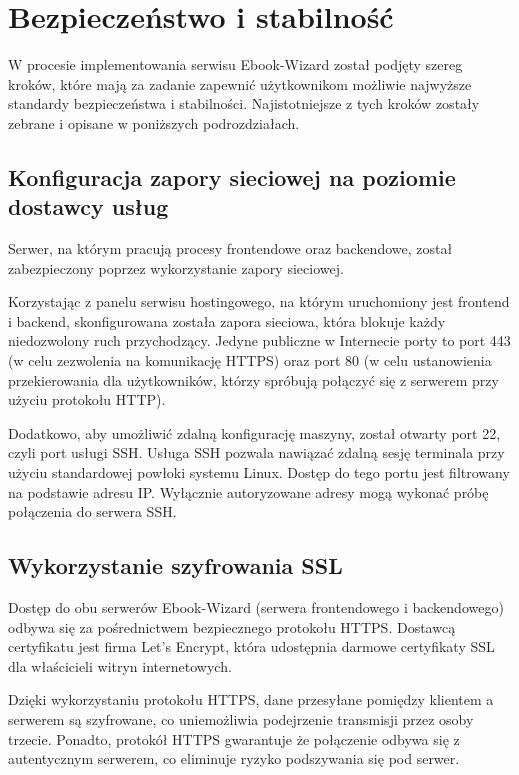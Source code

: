 \section{Bezpieczeństwo i stabilność}

W procesie implementowania serwisu Ebook-Wizard został podjęty szereg kroków, które mają za zadanie zapewnić użytkownikom możliwie najwyższe standardy bezpieczeństwa i stabilności. Najistotniejsze z tych kroków zostały zebrane i opisane w poniższych podrozdziałach.

\subsection{Konfiguracja zapory sieciowej na poziomie dostawcy usług}

Serwer, na którym pracują procesy frontendowe oraz backendowe, został zabezpieczony poprzez wykorzystanie zapory sieciowej.

Korzystając z panelu serwisu hostingowego, na którym uruchomiony jest frontend i backend, skonfigurowana została zapora sieciowa, która blokuje każdy niedozwolony ruch przychodzący. Jedyne publiczne w Internecie porty to port 443 (w celu zezwolenia na komunikację HTTPS) oraz port 80 (w celu ustanowienia przekierowania dla użytkowników, którzy spróbują połączyć się z serwerem przy użyciu protokołu HTTP). 

Dodatkowo, aby umożliwić zdalną konfigurację maszyny, został otwarty port 22, czyli port usługi SSH. Usługa SSH pozwala nawiązać zdalną sesję terminala przy użyciu standardowej powłoki systemu Linux. \cite{linux_administration_cookbook} Dostęp do tego portu jest filtrowany na podstawie adresu IP. Wyłącznie autoryzowane adresy mogą wykonać próbę połączenia do serwera SSH.

\subsection{Wykorzystanie szyfrowania SSL}

Dostęp do obu serwerów Ebook-Wizard (serwera frontendowego i backendowego) odbywa się za pośrednictwem bezpiecznego protokołu HTTPS. Dostawcą certyfikatu jest firma Let's Encrypt, która udostępnia darmowe certyfikaty SSL dla właścicieli witryn internetowych. \cite{lets_encrypt_docs}

Dzięki wykorzystaniu protokołu HTTPS, dane przesyłane pomiędzy klientem a serwerem są szyfrowane, co uniemożliwia podejrzenie transmisji przez osoby trzecie. Ponadto, protokół HTTPS gwarantuje że połączenie odbywa się z autentycznym serwerem, co eliminuje ryzyko podszywania się pod serwer. \cite{https_http_in_action}

